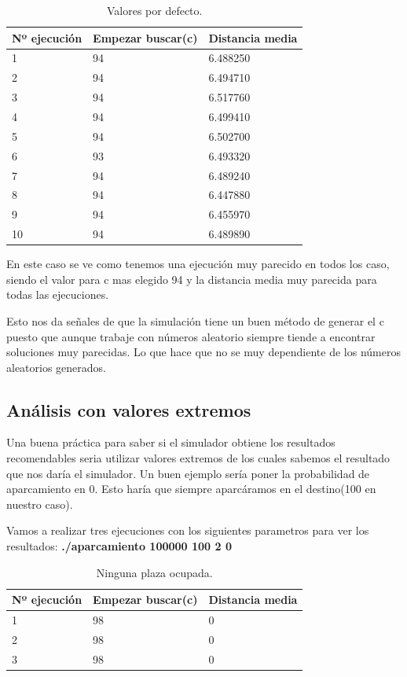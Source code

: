 \documentclass[]{article}
\begin{document}
 \begin{table}[htbp]
 	\begin{center}
 		\begin{tabular}{|l|l|l|}
 			\hline
 			Nº ejecución & Empezar buscar(c) & Distancia media \\
 			\hline \hline
 			1 & 94&6.488250
 			 \\ \hline
 			2 & 94&6.494710
 			 \\ \hline
 			3 & 94&6.517760
 			 \\ \hline
 			4 & 94&6.499410 \\ \hline
 			5 & 94&6.502700 \\ \hline
 			6 & 93&6.493320 \\ \hline
 			7 & 94&6.489240 \\ \hline
 			8 &  94&6.447880\\ \hline
 			9 & 94&6.455970 \\ \hline
 			10 & 94&6.489890 \\ \hline
 		\end{tabular}
 		\caption{Valores por defecto.}
 		\label{tabla:sencilla}
 	\end{center}
\end{table}
 En este caso se ve como tenemos una ejecución muy parecido en todos los caso, siendo el valor para c mas elegido 94 y la distancia media muy parecida para todas las ejecuciones.
 
 Esto nos da señales de que la simulación tiene un buen método de generar el c puesto que aunque trabaje con números aleatorio siempre tiende a encontrar soluciones muy parecidas. Lo que hace que no se muy dependiente de los números aleatorios generados.
 
 \subsection{Análisis con valores extremos}
 Una buena práctica para saber si el simulador obtiene los resultados recomendables seria utilizar valores extremos de los cuales sabemos el resultado que nos daría el simulador. Un buen ejemplo sería poner la probabilidad de aparcamiento en 0. Esto haría que siempre aparcáramos en el destino(100 en nuestro caso).
 
 
 Vamos a realizar tres ejecuciones con los siguientes parametros para ver los resultados:
 \textbf{./aparcamiento 100000 100 2 0 }
 
 \begin{table}[htbp]
 	\begin{center}
 		\begin{tabular}{|l|l|l|}
 			\hline
 			Nº ejecución & Empezar buscar(c) & Distancia media \\
 			\hline \hline
 			1 & 98&0
 			\\ \hline
 			2 & 98&0
 			\\ \hline
 			3 & 98&0
 			\\ \hline
 		\end{tabular}
 		\caption{Ninguna plaza ocupada.}
 		\label{tabla:sencilla}
 	\end{center}
\end{table}
\end{document}
